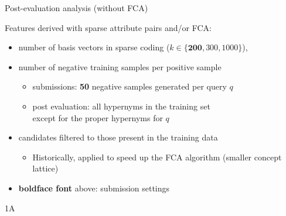 \documentclass{beamer}
\newlength{\onecolwid}
\newcommand{\bull}[1]{
  \begin{itemize}
    \item #1
  \end{itemize}
}
\begin{document}
\begin{frame}[t]
\begin{columns}[t]
\begin{column}{\onecolwid}
  \bigskip
  \begin{block}{Post-evaluation analysis (without FCA)}

    Features derived with \alert{sparse attribute pairs} and/or \alert{FCA}:
    

    \begin{itemize}
      \item number of basis vectors in sparse coding ($k \in
        \{\mathbf{200}, 300, 1000\}$),
      \item number of \alert negative training \alert samples per positive sample
        \begin{itemize}
          \item submissions: \textbf{50} negative samples generated per query $q$
          \item post evaluation: all hypernyms in the training set
            \\ except for the proper hypernyms for $q$
        \end{itemize}
      \item candidates filtered to those present in the training data
        \begin{itemize}
          \item Historically, applied to speed up the FCA algorithm
            (smaller concept lattice)
        \end{itemize}
      \item \textbf{boldface font} above: submission settings
    \end{itemize}

  \end{block}
  \bigskip
  \begin{block}{1A}
    




\end{block}
\end{column}
\end{columns}
\end{frame}
\end{document}

